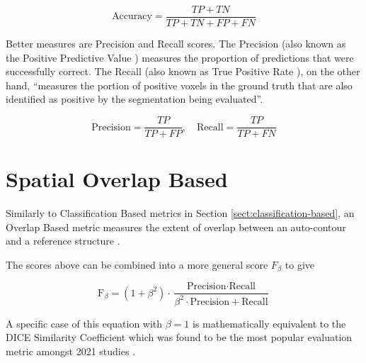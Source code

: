 \documentclass[11pt,twoside]{report}
\begin{document}
\begin{equation*}
  \text{Accuracy} = \frac{TP + TN}{TP + TN + FP + FN}
\end{equation*}

Better measures are Precision and Recall scores. The Precision (also known as the Positive Predictive Value \cite{evaluation-metrics}) measures the proportion of predictions that were successfully correct. The Recall (also known as True Positive Rate \cite{evaluation-metrics}), on the other hand, ``measures the portion of positive voxels in the ground truth that are also identified as positive by the segmentation being evaluated''.

\begin{equation*}
  \text{Precision} = \frac{TP}{TP+FP}, \quad \text{Recall} = \frac{TP}{TP+FN}
\end{equation*}

\section{Spatial Overlap Based} \label{sect:spatial-overlap-based}

Similarly to Classification Based metrics in Section \ref{sect:classification-based}, an Overlap Based metric measures the extent of overlap between an auto-contour and a reference structure \cite{review-metrics}. 

The scores above can be combined into a more general score $F_\beta$ to give 

\begin{equation*}
  \text{F}_\beta = (1+\beta^2)\cdot \frac{\text{Precision} \cdot \text{Recall}}{\beta^2 \cdot \text{Precision}+\text{Recall}}
\end{equation*}

A specific case of this equation with $\beta=1$ is mathematically equivalent to the DICE Similarity Coefficient which was found to be the most popular evaluation metric amongst 2021 studies \cite{review-metrics,evaluation-metrics, Sherer2021-le}. 

\end{document}
